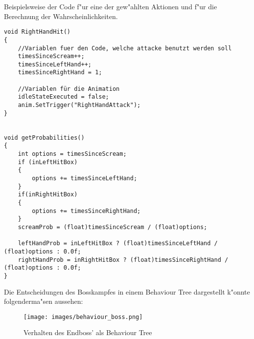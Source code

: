 Beispielsweise der Code f"ur eine der gew"ahlten Aktionen und f"ur die Berechnung der Wahrscheinlichkeiten.

\begin{lstlisting}[breaklines=true]
void RightHandHit()
{
	//Variablen fuer den Code, welche attacke benutzt werden soll
	timesSinceScream++;
	timesSinceLeftHand++;
	timesSinceRightHand = 1;
	
	//Variablen für die Animation
	idleStateExecuted = false;
	anim.SetTrigger("RightHandAttack");
}


void getProbabilities()
{
	int options = timesSinceScream;
	if (inLeftHitBox)
	{ 
		options += timesSinceLeftHand;
	}
	if(inRightHitBox)
	{
		options += timesSinceRightHand;
	}
	screamProb = (float)timesSinceScream / (float)options;
	
	leftHandProb = inLeftHitBox ? (float)timesSinceLeftHand / (float)options : 0.0f;
	rightHandProb = inRightHitBox ? (float)timesSinceRightHand / (float)options : 0.0f;
}
\end{lstlisting}

Die Entscheidungen des Bosskampfes in einem Behaviour Tree dargestellt k"onnte folgenderma"sen aussehen:
\begin{figure}
	\centering
	\texttt{[image: images/behaviour\_boss.png]}
	\caption{Verhalten des Endboss' als Behaviour Tree}
	\label{fig:behaviour_tree_boss}
\end{figure}